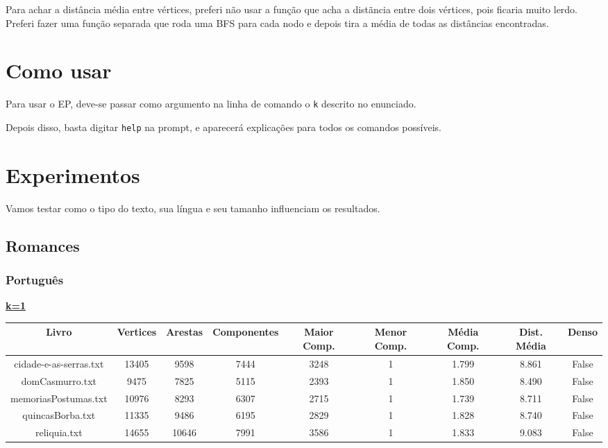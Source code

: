 \documentclass[12pt]{article}
\newcommand{\mytitle}[1]{\textbf{\underline{#1}}}
\begin{document}
Para achar a distância média entre vértices, preferi não usar a função que acha a distãncia entre dois vértices, pois ficaria muito lerdo. Preferi fazer uma função separada que roda uma BFS para cada nodo e depois tira a média de todas as distâncias encontradas.

\section{Como usar}

Para usar o EP, deve-se passar como argumento na linha de comando o \texttt{k} descrito no enunciado.

Depois disso, basta digitar \texttt{help} na prompt, e aparecerá explicações para todos os comandos possíveis.

\newpage

\section{Experimentos}

Vamos testar como o tipo do texto, sua língua e seu tamanho influenciam os resultados.

\subsection{Romances}

\subsubsection{Português}

\noindent\mytitle{k=1}
\begin{center}
\begin{tabular}{||c | c | c | c | c | c | c | c | c||}
\hline
Livro & Vertices & Arestas & Componentes & Maior Comp. & Menor Comp. & Média Comp. & Dist. Média & Denso \\ [0.5ex]
\hline\hline
cidade-e-as-serras.txt & 13405 & 9598 & 7444 & 3248 & 1 & 1.799 & 8.861 & False \\
\hline
domCasmurro.txt & 9475 & 7825 & 5115 & 2393 & 1 & 1.850 & 8.490 & False \\
\hline
memoriasPostumas.txt & 10976 & 8293 & 6307 & 2715 & 1 & 1.739 & 8.711 & False \\
\hline
quincasBorba.txt & 11335 & 9486 & 6195 & 2829 & 1 & 1.828 & 8.740 & False \\
\hline
reliquia.txt & 14655 & 10646 & 7991 & 3586 & 1 & 1.833 & 9.083 & False \\
\hline
\end{tabular}
\end{center}
\end{document}
